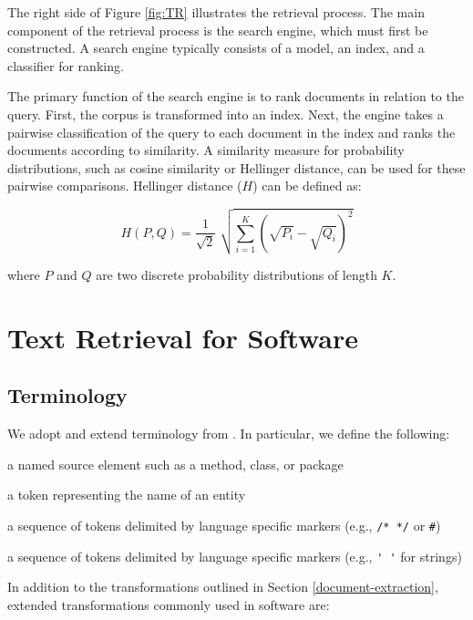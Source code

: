 \documentclass[12pt,draft]{Manuscript}
\begin{document}
\begin{body}
The right side of Figure \ref{fig:TR} illustrates the retrieval process.
The main component of the retrieval process is the search engine, which
must first be constructed. A search engine typically consists of a
model, an index, and a classifier for ranking.

The primary function of the search engine is to rank documents in
relation to the query. First, the corpus is transformed into an index.
Next, the engine takes a pairwise classification of the query to each
document in the index and ranks the documents according to similarity. A
similarity measure for probability distributions, such as cosine
similarity or Hellinger distance, can be used for these pairwise
comparisons. Hellinger distance (\(H\)) can be defined as:

\begin{equation}
    H(P, Q) = \frac{1}{\sqrt{2}} \; \sqrt{\sum_{i=1}^{K} (\sqrt{P_i} - \sqrt{Q_i})^2}
\label{eq:hellinger}
\end{equation}

where \(P\) and \(Q\) are two discrete probability distributions of
length \(K\).

\section{Text Retrieval for Software}\label{related-software-TR}

\subsection{Terminology}\label{terminology-1}

We adopt and extend terminology from \citet{Biggers-etal:2014}. In
particular, we define the following:

\begin{description}
\itemsep1pt\parskip0pt
\item[entity]
a named source element such as a method, class, or package
\item[identifier]
a token representing the name of an entity
\item[comment]
a sequence of tokens delimited by language specific markers (e.g.,
\lstinline!/* */! or \lstinline!#!)
\item[literal]
a sequence of tokens delimited by language specific markers (e.g.,
\lstinline!' '! for strings)
\end{description}

In addition to the transformations outlined in Section
\ref{document-extraction}, extended transformations
\citep{Marcus-etal:2004, Marcus-Menzies:2010} commonly used in software
are:


\end{body}
\end{document}
